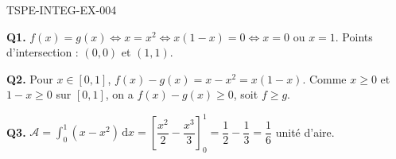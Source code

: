 \begin{corrige}{TSPE-INTEG-EX-004}

\textbf{Q1.} $f(x)=g(x) \iff x=x^2 \iff x(1-x)=0 \iff x=0$ ou $x=1$. Points d'intersection : $(0,0)$ et $(1,1)$.

\textbf{Q2.} Pour $x \in [0,1]$, $f(x)-g(x) = x-x^2 = x(1-x)$. Comme $x \geq 0$ et $1-x \geq 0$ sur $[0,1]$, on a $f(x)-g(x) \geq 0$, soit $f \geq g$.

\textbf{Q3.} $\mathcal{A} = \displaystyle\int_0^1 (x-x^2)\,\mathrm{d}x = \left[\dfrac{x^2}{2}-\dfrac{x^3}{3}\right]_0^1 = \dfrac{1}{2}-\dfrac{1}{3} = \boxed{\dfrac{1}{6}}$ unité d'aire.

\end{corrige}
